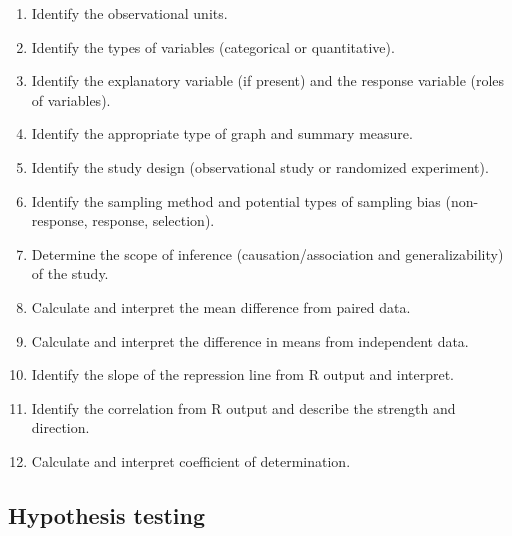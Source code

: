 \documentclass[
]{report}
\begin{document}
\begin{enumerate}
\def\labelenumi{\arabic{enumi}.}
\item
  Identify the observational units.
\item
  Identify the types of variables (categorical or quantitative).
\item
  Identify the explanatory variable (if present) and the response variable (roles of variables).
\item
  Identify the appropriate type of graph and summary measure.
\item
  Identify the study design (observational study or randomized experiment).
\item
  Identify the sampling method and potential types of sampling bias (non-response, response, selection).
\item
  Determine the scope of inference (causation/association and generalizability) of the study.
\item
  Calculate and interpret the mean difference from paired data.
\item
  Calculate and interpret the difference in means from independent data.
\item
  Identify the slope of the repression line from R output and interpret.
\item
  Identify the correlation from R output and describe the strength and direction.
\item
  Calculate and interpret coefficient of determination.
\end{enumerate}

\subsection*{Hypothesis testing}\label{hypothesis-testing-7}
\end{document}
